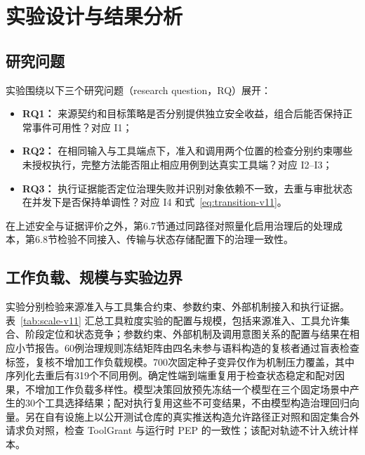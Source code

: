 \section{实验设计与结果分析}\label{sec:evaluation-v11}

\subsection{研究问题}

实验围绕以下三个研究问题（research question，RQ）展开：
\begin{itemize}
  \item \textbf{RQ1：} 来源契约和目标策略是否分别提供独立安全收益，组合后能否保持正常事件可用性？对应 I1；
  \item \textbf{RQ2：} 在相同输入与工具端点下，准入和调用两个位置的检查分别约束哪些未授权执行，完整方法能否阻止相应用例到达真实工具端？对应 I2--I3；
  \item \textbf{RQ3：} 执行证据能否定位治理失败并识别对象依赖不一致，去重与审批状态在并发下是否保持单调性？对应 I4 和式~\eqref{eq:transition-v11}。
\end{itemize}

在上述安全与证据评价之外，第6.7节通过同路径对照量化启用治理后的处理成本，第6.8节检验不同接入、传输与状态存储配置下的治理一致性。

\subsection{工作负载、规模与实验边界}

实验分别检验来源准入与工具集合约束、参数约束、外部机制接入和执行证据。表~\ref{tab:scale-v11} 汇总工具粒度实验的配置与规模，包括来源准入、工具允许集合、阶段定位和状态竞争；参数约束、外部机制及调用意图关系的配置与结果在相应小节报告。60例治理规则冻结矩阵由四名未参与语料构造的复核者通过盲表检查标签，复核不增加工作负载规模。700次固定种子变异仅作为机制压力覆盖，其中序列化去重后有319个不同用例。确定性端到端重复用于检查状态稳定和配对因果，不增加工作负载多样性。模型决策回放预先冻结一个模型在三个固定场景中产生的30个工具选择结果；配对执行复用这些不可变结果，不由模型构造治理回归向量。另在自有设施上以公开测试仓库的真实推送构造允许路径正对照和固定集合外请求负对照，检查 ToolGrant 与运行时 PEP 的一致性；该配对轨迹不计入统计样本。

